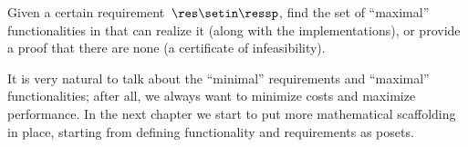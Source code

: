 \begin{problem}[FixReqMinFun]
\label{prob:FixReqMinFun-informal}
Given a certain requirement~$\res\setin\ressp$, find the set of ``maximal'' functionalities in that can realize it (along with the implementations), or provide a proof that there are none (a certificate of infeasibility).
\end{problem}

It is very natural to talk about the ``minimal'' requirements and ``maximal'' functionalities; after all, we always want to minimize costs and maximize performance.
In the next chapter we start to put more mathematical scaffolding in place, starting from defining functionality and requirements as posets.


